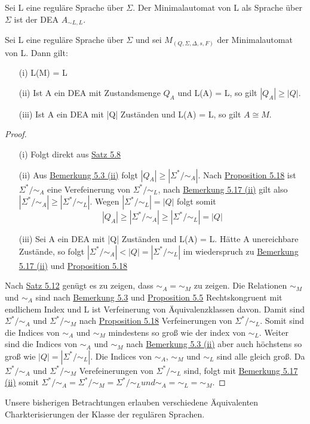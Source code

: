   Sei L eine reguläre Sprache über \(\Sigma\). Der Minimalautomat von L als Sprache über \(\Sigma\) ist der DEA \(A_{\sim L, L}\).

  Sei L eine reguläre Sprache über \(\Sigma\) und sei \(M_(Q, \Sigma, \Delta, s ,F)\) der Minimalautomat von L. Dann gilt:
  \begin{itemize}
    \item [(i)] L(M) = L
    \item [(ii)] Ist A ein DEA mit Zustandsmenge \(Q_A\) und L(A) = L, so gilt \(|Q_A| \geq |Q|\).
    \item [(iii)] Ist A ein DEA mit |Q| Zuständen und L(A) = L, so gilt \(A \cong M\).
  \end{itemize}
  \begin{proof}
    \begin{itemize}
      \item [(i)] Folgt direkt aus \hyperref[subsec:5.8]{Satz 5.8} 
      \item [(ii)] Aus \hyperref[subsec:5.3]{Bemerkung 5.3 (ii)} folgt \(|Q_A| \geq |\Sigma^* / \sim_A|\). Nach \hyperref[subsec:5.18]{Proposition 5.18} ist \(\Sigma^* / \sim_A\) eine Verefeinerung von \(\Sigma^* / \sim_L\), nach \hyperref[subsec:5.17]{Bemerkung 5.17 (ii)} gilt also \(|\Sigma^* / \sim_A| \geq |\Sigma^* / \sim_L|\). Wegen \(|\Sigma^* / \sim_L| = |Q|\) folgt somit 
      \[
        |Q_A| \geq |\Sigma^* / \sim_A| \geq |\Sigma^* / \sim_L| = |Q|
      \]
      \item [(iii)] Sei A ein DEA mit |Q| Zuständen und L(A) = L. Hätte A unereichbare Zustände, so folgt \(|\Sigma^* / \sim_A| < |Q| = |\Sigma^* /\sim_L|\) im wiederspruch zu \hyperref[subsec:5.17]{Bemerkung 5.17 (ii)} und \hyperref[subsec:5.18]{Proposition 5.18} 
    \end{itemize}
    Nach \hyperref[subsec:5.12]{Satz 5.12} genügt es zu zeigen, dass \(\sim_A = \sim_M\) zu zeigen. Die Relationen \(\sim_M\) und \(\sim_A\) sind nach \hyperref[subsec:5.3]{Bemerkung 5.3} und \hyperref[subsec:5.5]{Proposition 5.5} Rechtskongruent mit endlichem Index und L ist Verfeinerung von Äquivalenzklassen davon. Damit sind \(\Sigma^* / \sim_A\) und \(\Sigma^* / \sim_M\) nach \hyperref[subsec:5.18]{Proposition 5.18} Verfeinerungen von \(\Sigma^* /\sim_L\). Somit sind die Indices von \(\sim_A\) und \(\sim_M\) mindestens so groß wie der index von \(\sim_L\). Weiter sind die Indices von \(\sim_A\) und \(\sim_M\) nach \hyperref[subsec:5.3]{Bemerkung 5.3 (ii)} aber auch höchstens so groß wie \(|Q| = |\Sigma^* / \sim_L|\). Die Indices von \(\sim_A\), \(\sim_M\) und \(\sim_L\) sind alle gleich groß. Da \(\Sigma^* / \sim_A\) und \(\Sigma^* / \sim_M\) Verefeinerungen von \(\Sigma^* /\sim_L\) sind, folgt mit \hyperref[subsec:5.17]{Bemerkung 5.17 (ii)} somit \(\Sigma^* /\sim_A = \Sigma^* /\sim_M = \Sigma^* /\sim_L und \sim_A = \sim_L = \sim_M\). 
  \end{proof}
  Unsere bisherigen Betrachtungen erlauben verschiedene Äquivalenten Charkterisierungen der Klasse der regulären Sprachen.

